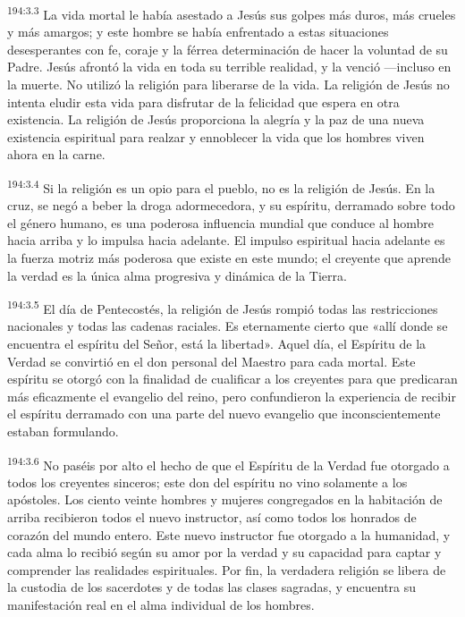 \par 
\textsuperscript{194:3.3} La vida mortal le había asestado a Jesús sus golpes más duros, más crueles y más amargos; y este hombre se había enfrentado a estas situaciones desesperantes con fe, coraje y la férrea determinación de hacer la voluntad de su Padre. Jesús afrontó la vida en toda su terrible realidad, y la venció ---incluso en la muerte. No utilizó la religión para liberarse de la vida. La religión de Jesús no intenta eludir esta vida para disfrutar de la felicidad que espera en otra existencia. La religión de Jesús proporciona la alegría y la paz de una nueva existencia espiritual para realzar y ennoblecer la vida que los hombres viven ahora en la carne.

\par 
\textsuperscript{194:3.4} Si la religión es un opio para el pueblo, no es la religión de Jesús. En la cruz, se negó a beber la droga adormecedora, y su espíritu, derramado sobre todo el género humano, es una poderosa influencia mundial que conduce al hombre hacia arriba y lo impulsa hacia adelante. El impulso espiritual hacia adelante es la fuerza motriz más poderosa que existe en este mundo; el creyente que aprende la verdad es la única alma progresiva y dinámica de la Tierra.

\par 
\textsuperscript{194:3.5} El día de Pentecostés, la religión de Jesús rompió todas las restricciones nacionales y todas las cadenas raciales. Es eternamente cierto que «allí donde se encuentra el espíritu del Señor, está la libertad». Aquel día, el Espíritu de la Verdad se convirtió en el don personal del Maestro para cada mortal. Este espíritu se otorgó con la finalidad de cualificar a los creyentes para que predicaran más eficazmente el evangelio del reino, pero confundieron la experiencia de recibir el espíritu derramado con una parte del nuevo evangelio que inconscientemente estaban formulando.

\par 
\textsuperscript{194:3.6} No paséis por alto el hecho de que el Espíritu de la Verdad fue otorgado a todos los creyentes sinceros; este don del espíritu no vino solamente a los apóstoles. Los ciento veinte hombres y mujeres congregados en la habitación de arriba recibieron todos el nuevo instructor, así como todos los honrados de corazón del mundo entero. Este nuevo instructor fue otorgado a la humanidad, y cada alma lo recibió según su amor por la verdad y su capacidad para captar y comprender las realidades espirituales. Por fin, la verdadera religión se libera de la custodia de los sacerdotes y de todas las clases sagradas, y encuentra su manifestación real en el alma individual de los hombres.


